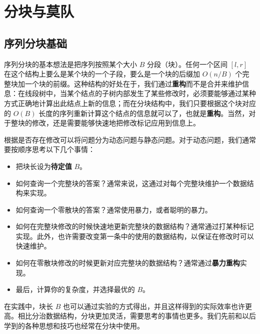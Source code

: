 \chapter{分块与莫队}

\section{序列分块基础}

序列分块的基本想法是把序列按照某个大小 $B$ 分段（块）。任何一个区间 $[l,r]$ 在这个结构上要么是某个块的一个子段，要么是一个块的后缀加 $O(n/B)$ 个完整块加一个块的前缀。这种结构的好处在于，我们通过\textbf{重构}而不是合并来维护信息：在线段树中，当某个结点的子树内部发生了某些修改时，必须要能够通过某种方式正确地计算出此结点上新的信息；而在分块结构中，我们只要根据这个块对应的 $O(B)$ 长度的序列重新计算这个结点的信息就可以了，也就是\textbf{重构}。当然，对于整块的修改，还是需要能够快速地把修改标记应用到信息上。

根据是否存在修改可以将问题分为动态问题与静态问题。对于动态问题，我们通常要按顺序思考以下几个事情：
\begin{itemize}
    \item 把块长设为\textbf{待定值} $B$。
    \item 如何查询一个完整块的答案？通常来说，这通过对每个完整块维护一个数据结构来实现。
    \item 如何查询一个零散块的答案？通常使用暴力，或者聪明的暴力。
    \item 如何在完整块修改的时候快速地更新完整块的数据结构？通常通过打某种标记实现。此外，也许需要改变第一条中的使用的数据结构，以保证在修改时可以快速维护。
    \item 如何在零散块修改的时候更新对应完整块的数据结构？通常通过\textbf{暴力重构}实现。
    \item 最后，计算你的复杂度，并选择最优的 $B$。
\end{itemize}

在实践中，块长 $B$ 也可以通过实验的方式得出，并且这样得到的实际效率也许更高。相比分治数据结构，分块更加灵活，需要思考的事情也更多。我们先前和以后学到的各种思想和技巧也经常在分块中使用。

